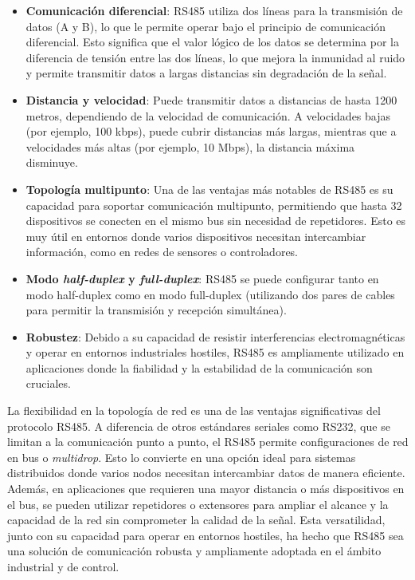 \begin{itemize}
    \item \textbf{Comunicación diferencial}: RS485 utiliza dos líneas para la transmisión de datos (A y B), lo que le permite operar bajo el principio de comunicación diferencial. Esto significa que el valor lógico de los datos se determina por la diferencia de tensión entre las dos líneas, lo que mejora la inmunidad al ruido y permite transmitir datos a largas distancias sin degradación de la señal.

    \item \textbf{Distancia y velocidad}: Puede transmitir datos a distancias de hasta 1200 metros, dependiendo de la velocidad de comunicación. A velocidades bajas (por ejemplo, 100 kbps), puede cubrir distancias más largas, mientras que a velocidades más altas (por ejemplo, 10 Mbps), la distancia máxima disminuye.

    \item \textbf{Topología multipunto}: Una de las ventajas más notables de RS485 es su capacidad para soportar comunicación multipunto, permitiendo que hasta 32 dispositivos se conecten en el mismo bus sin necesidad de repetidores. Esto es muy útil en entornos donde varios dispositivos necesitan intercambiar información, como en redes de sensores o controladores.

    \item \textbf{Modo \textit{half-duplex} y \textit{full-duplex}}: RS485 se puede configurar tanto en modo half-duplex como en modo full-duplex (utilizando dos pares de cables para permitir la transmisión y recepción simultánea).

    \item \textbf{Robustez}: Debido a su capacidad de resistir interferencias electromagnéticas y operar en entornos industriales hostiles, RS485 es ampliamente utilizado en aplicaciones donde la fiabilidad y la estabilidad de la comunicación son cruciales.

\end{itemize}

La flexibilidad en la topología de red es una de las ventajas significativas del protocolo RS485. A diferencia de otros estándares seriales como RS232, que se limitan a la comunicación punto a punto, el RS485 permite configuraciones de red en bus o \textit{multidrop}. Esto lo convierte en una opción ideal para sistemas distribuidos donde varios nodos necesitan intercambiar datos de manera eficiente. Además, en aplicaciones que requieren una mayor distancia o más dispositivos en el bus, se pueden utilizar repetidores o extensores para ampliar el alcance y la capacidad de la red sin comprometer la calidad de la señal. Esta versatilidad, junto con su capacidad para operar en entornos hostiles, ha hecho que RS485 sea una solución de comunicación robusta y ampliamente adoptada en el ámbito industrial y de control.